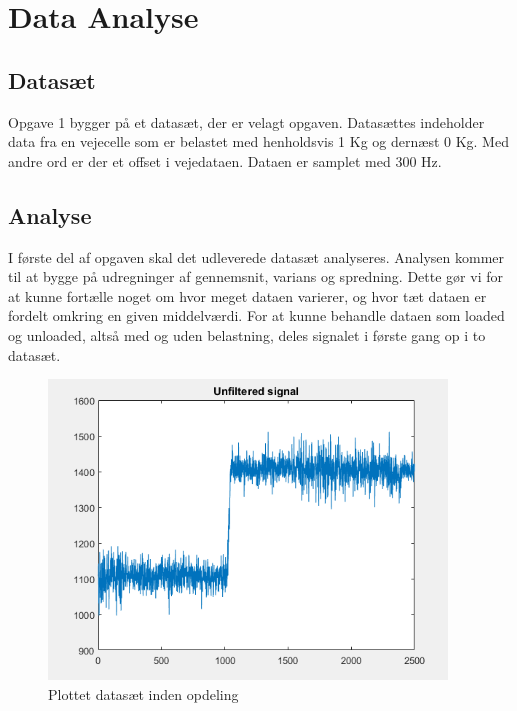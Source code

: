 \graphicspath{{Chapters/Opgave1/}}

\chapter{Data Analyse}

\section{Datasæt}
Opgave 1 bygger på et datasæt, der er velagt opgaven. Datasættes indeholder data fra en vejecelle som er belastet med henholdsvis 1 Kg og dernæst 0 Kg. Med andre ord er der et offset i vejedataen. Dataen er samplet med 300 Hz. 

\section{Analyse}
I første del af opgaven skal det udleverede datasæt analyseres. Analysen kommer til at bygge på udregninger af gennemsnit, varians og spredning. Dette gør vi for at kunne fortælle noget om hvor meget dataen varierer, og hvor tæt dataen er fordelt omkring en given middelværdi. For at kunne behandle dataen som loaded og unloaded, altså med og uden belastning, deles signalet i første gang op i to datasæt.

\begin{figure}[H]
\centering
\includegraphics[width = 300pt]{Img/IndenOpdeling.PNG}
\caption{Plottet datasæt inden opdeling}
\label{fig:IndenOpdeling}
\end{figure}

